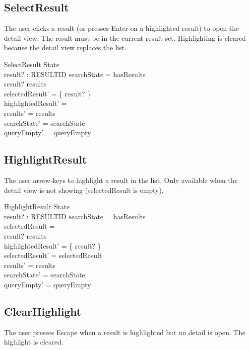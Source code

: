 \documentclass[a4paper,10pt,fleqn]{article}
\begin{document}
\subsection{SelectResult}

The user clicks a result (or presses Enter on a highlighted result) to
open the detail view. The result must be in the current result set.
Highlighting is cleared because the detail view replaces the list.

\begin{schema}{SelectResult}
  \Delta State \\
  result? : RESULTID
  \where
  searchState = hasResults \\
  result? \in results \\
  selectedResult' = \{ result? \} \\
  highlightedResult' = \emptyset \\
  results' = results \\
  searchState' = searchState \\
  queryEmpty' = queryEmpty
\end{schema}

\subsection{HighlightResult}

The user arrow-keys to highlight a result in the list. Only available
when the detail view is not showing (selectedResult is empty).

\begin{schema}{HighlightResult}
  \Delta State \\
  result? : RESULTID
  \where
  searchState = hasResults \\
  selectedResult = \emptyset \\
  result? \in results \\
  highlightedResult' = \{ result? \} \\
  selectedResult' = selectedResult \\
  results' = results \\
  searchState' = searchState \\
  queryEmpty' = queryEmpty
\end{schema}

\subsection{ClearHighlight}

The user presses Escape when a result is highlighted but no detail is
open. The highlight is cleared.
\end{document}
